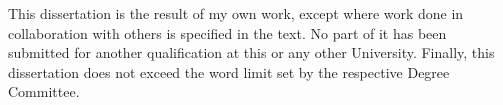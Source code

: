 
\begin{declaration}


This dissertation is the result of my own work, except where work done in collaboration with others is specified in the text. No part of it has been submitted for another qualification at this or any other University. Finally, this dissertation does not exceed the word limit set by the respective Degree Committee. %




\end{declaration}

